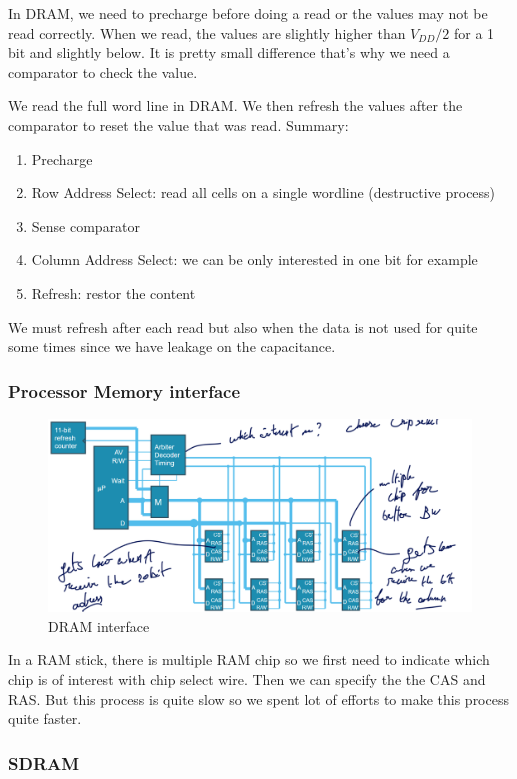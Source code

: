 \documentclass{report}
\begin{document}
In DRAM, we need to precharge before doing a read or the values may not be read correctly. When we read, the values are slightly higher than $V_{DD}/2$ for a 1 bit and slightly below. It is pretty small difference that's why we need a comparator to check the value.

We read the full word line in DRAM. We then refresh the values after the comparator to reset the value that was read. Summary:

\begin{enumerate}
    \item Precharge
    \item Row Address Select: read all cells on a single wordline (destructive process)
    \item Sense comparator
    \item Column Address Select: we can be only interested in one bit for example
    \item Refresh: restor the content
\end{enumerate}

We must refresh after each read but also when the data is not used for quite some times since we have leakage on the capacitance.

\subsubsection{Processor Memory interface}

\begin{figure}[H]
    \centering
    \includegraphics[width=0.75\linewidth]{interface_ram.png}
    \caption{DRAM interface}
    \label{fig:enter-label}
\end{figure}

In a RAM stick, there is multiple RAM chip so we first need to indicate which chip is of interest with chip select wire. Then we can specify the the CAS and RAS. But this process is quite slow so we spent lot of efforts to make this process quite faster.

\subsubsection{SDRAM}
\end{document}
